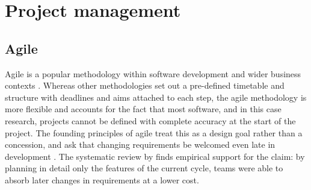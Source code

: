 \chapter{Project management}\label{ch:project-management}

\section{Agile}\label{sec:agile}

Agile is a popular methodology within software development and wider business
contexts \citep{anifa2024systematic}. Whereas other methodologies set out a
pre-defined timetable and structure with deadlines and aims attached to each
step, the agile methodology is more flexible and accounts for the fact that most
software, and in this case research, projects cannot be defined with complete
accuracy at the start of the project. The founding principles of agile treat
this as a design goal rather than a concession, and ask that changing
requirements be welcomed even late in development \citep{beck2001manifesto}. The
systematic review by \citet{dyba2008empirical} finds empirical support for the
claim: by planning in detail only the features of the current cycle, teams were
able to absorb later changes in requirements at a lower cost.

